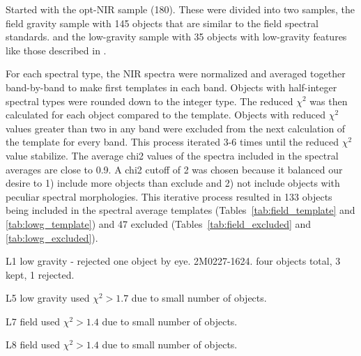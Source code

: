 \documentclass[12pt,preprint]{aastex}
\begin{document}
Started with the opt-NIR sample (180). These were divided into two samples, the field gravity sample with 145 objects that are similar to the \citet{K99} field spectral standards.
 and the low-gravity sample with 35 objects with low-gravity features like those described in \citet{Cruz09_lowg}.

For each spectral type, the NIR spectra were normalized and averaged together band-by-band to make first templates in each band. Objects with half-integer spectral types were rounded down to the integer type.
The reduced $\chi^2$ was then calculated for each object compared to the template.
Objects with reduced $\chi^2$ values greater than two in any band were excluded from the next calculation of the template for every band.
This process iterated 3-6 times until the reduced $\chi^2$ value stabilize. The average chi2 values of the spectra included in the spectral averages are close to 0.9. A chi2 cutoff of 2 was chosen because it balanced our desire to 1) include more objects than exclude and 2) not include objects with peculiar spectral morphologies. 
This iterative process resulted in 133 objects being included in the spectral average templates (Tables~\ref{tab:field_template} and \ref{tab:lowg_template}) and 47 excluded (Tables~\ref{tab:field_excluded} and \ref{tab:lowg_excluded}). 


L1 low gravity - rejected one object by eye. 2M0227-1624. four objects total, 3 kept, 1 rejected. 

L5 low gravity used $\chi^2 > 1.7$ due to small number of objects.

L7 field used $\chi^2 > 1.4$ due to small number of objects.

L8 field used $\chi^2 > 1.4$ due to small number of objects.

\end{document}
